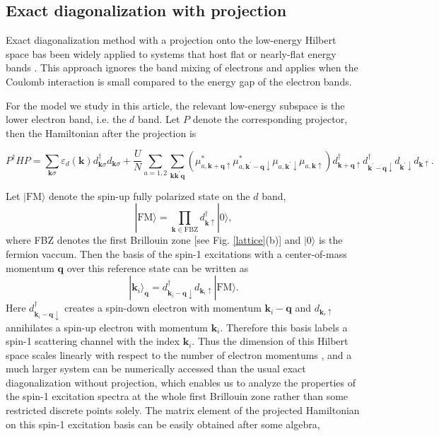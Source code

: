 \documentclass[amsmath,superscriptaddress,showpacs,aps,prb,twocolumn]{revtex4-1}
\begin{document}
\subsection{Exact diagonalization with projection}\label{exact_diag_proj}
\par Exact diagonalization method with a projection onto the low-energy Hilbert space bas been widely applied to systems that host flat or nearly-flat energy bands \cite{NSCM_PRL2011,RB_PRX2011,NSRCM_PRB2011,SGDL_arXiv2008,NSRCM_PRL2012,DG_PRB2015}. This approach ignores the band mixing of electrons and applies when the Coulomb interaction is small compared to the energy gap of the electron bands.

\par For the model we study in this article, the relevant low-energy subspace is the lower electron band, i.e. the $d$ band. Let $P$ denote the corresponding projector, then the Hamiltonian after the projection is
\begin{widetext}
\begin{equation}
P^\dagger HP=\sum_{\mathbf{k}\sigma}\varepsilon_d(\mathbf{k})d^{\dagger}_{\mathbf{k}\sigma}d_{\mathbf{k}\sigma}
+\frac{U}{N}\sum_{a=1,2}\sum_{\mathbf{k}\mathbf{k}^{\prime}\mathbf{q}}
(\mu^{\ast}_{a,\mathbf{k}+\mathbf{q}\uparrow}\mu^{\ast}_{a,\mathbf{k}^{\prime}-\mathbf{q}\downarrow}\mu_{a,\mathbf{k}^{\prime}\downarrow}\mu_{a,\mathbf{k}\uparrow})
d^{\dagger}_{\mathbf{k}+\mathbf{q}\uparrow}d^{\dagger}_{\mathbf{k}^{\prime}-\mathbf{q}\downarrow}d_{\mathbf{k}^{\prime}\downarrow}d_{\mathbf{k}\uparrow}.
\end{equation}
\end{widetext}
Let $|\text{FM}\rangle$ denote the spin-up fully polarized state on the $d$ band,
\begin{equation}
|\text{FM}\rangle=\prod_{\mathbf{k}\in \text{FBZ}}d^{\dagger}_{\mathbf{k}\uparrow}|\text{0}\rangle,
\end{equation}
where FBZ denotes the first Brillouin zone [see Fig. \ref{lattice}(b)] and $|0\rangle$ is the fermion vaccum. Then the basis of the spin-1 excitations with a center-of-mass momentum $\mathbf{q}$ over this reference state can be written as
\begin{equation}
|\mathbf{k}_i\rangle_\mathbf{q}=d^{\dagger}_{\mathbf{k}_{i}-\mathbf{q}\downarrow}d_{\mathbf{k}_{i}\uparrow}|\text{FM}\rangle.
\end{equation}
Here $d^{\dagger}_{\mathbf{k}_{i}-\mathbf{q}\downarrow}$ creates a spin-down electron with momentum $\mathbf{k}_{i}-\mathbf{q}$ and $d_{\mathbf{k}_{i}\uparrow}$ annihilates a spin-up electron with momentum $\mathbf{k}_{i}$. Therefore this basis labels a spin-1 scattering channel with the index $\mathbf{k}_{i}$. Thus the dimension of this Hilbert space scales linearly with respect to the number of electron momentums \cite{SGDL_arXiv2008}, and a much larger system can be numerically accessed than the usual exact diagonalization without projection, which enables us to analyze the properties of the spin-1 excitation spectra at the whole first Brillouin zone rather than some restricted discrete points solely. The matrix element of the projected Hamiltonian on this spin-1 excitation basis can be easily obtained after some algebra,
\end{document}
